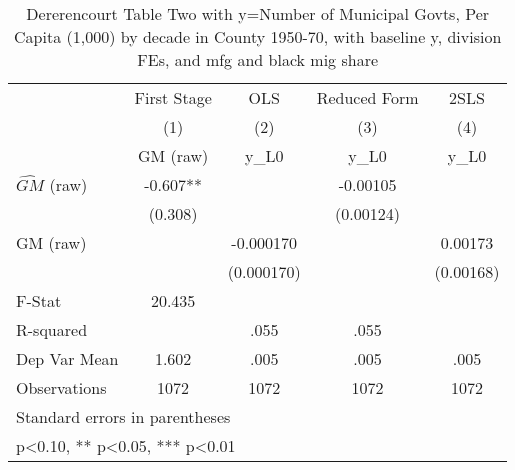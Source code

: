 \begin{table}[htbp]\centering
\def\sym#1{\ifmmode^{#1}\else\(^{#1}\)\fi}
\caption{Dererencourt Table Two with y=Number of Municipal Govts, Per Capita (1,000) by decade in County 1950-70, with baseline y, division FEs, and mfg and black mig share}
\begin{tabular}{l*{4}{c}}
\toprule
                    & First Stage   &         OLS   &Reduced Form   &        2SLS   \\
                    &\multicolumn{1}{c}{(1)}&\multicolumn{1}{c}{(2)}&\multicolumn{1}{c}{(3)}&\multicolumn{1}{c}{(4)}\\
                    &\multicolumn{1}{c}{GM  (raw)}&\multicolumn{1}{c}{y\_L0}&\multicolumn{1}{c}{y\_L0}&\multicolumn{1}{c}{y\_L0}\\
\midrule
$\hat{GM}$ (raw)    &      -0.607** &               &    -0.00105   &               \\
                    &     (0.308)   &               &   (0.00124)   &               \\
\addlinespace
GM  (raw)           &               &   -0.000170   &               &     0.00173   \\
                    &               &  (0.000170)   &               &   (0.00168)   \\
\midrule
F-Stat              &      20.435   &               &               &               \\
R-squared           &               &        .055   &        .055   &               \\
Dep Var Mean        &       1.602   &        .005   &        .005   &        .005   \\
Observations        &        1072   &        1072   &        1072   &        1072   \\
\bottomrule
\multicolumn{5}{l}{\footnotesize Standard errors in parentheses}\\
\multicolumn{5}{l}{\footnotesize * p<0.10, ** p<0.05, *** p<0.01}\\
\end{tabular}
\end{table}
